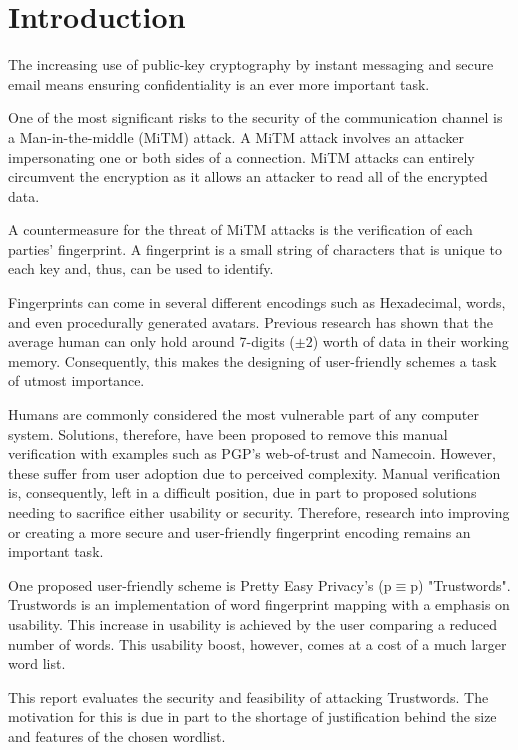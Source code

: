 \chapter{Introduction}
\label{cha:Introduction}

The increasing use of public-key cryptography by instant messaging and secure email means ensuring confidentiality is an ever more important task.

One of the most significant risks to the security of the communication channel is a Man-in-the-middle (MiTM) attack. A MiTM attack involves an attacker impersonating one or both sides of a connection. MiTM attacks can entirely circumvent the encryption as it allows an attacker to read all of the encrypted data. 

A countermeasure for the threat of MiTM attacks is the verification of each parties’ fingerprint. A fingerprint is a small string of characters that is unique to each key and, thus, can be used to identify.

Fingerprints can come in several different encodings such as Hexadecimal, words, and even procedurally generated avatars. Previous research has shown that the average human can only hold around 7-digits ($\pm 2$) worth of data in their working memory\cite{miller1956magical}. Consequently, this makes the designing of user-friendly schemes a task of utmost importance.

Humans are commonly considered the most vulnerable part of any computer system. Solutions, therefore, have been proposed to remove this manual verification with examples such as PGP's web-of-trust\cite{callas1998openpgp} and Namecoin\cite{kalodner2015empirical}. However, these suffer from user adoption due to perceived complexity. Manual verification is, consequently, left in a difficult position, due in part to proposed solutions needing to sacrifice either usability or security. Therefore, research into improving or creating a more secure and user-friendly fingerprint encoding remains an important task.

One proposed user-friendly scheme is Pretty Easy Privacy's (p$\equiv$p) "Trustwords". Trustwords is an implementation of word fingerprint mapping with a emphasis on usability. This increase in usability is achieved by the user comparing a reduced number of words. This usability boost, however, comes at a cost of a much larger word list.

This report evaluates the security and feasibility of attacking Trustwords. The motivation for this is due in part to the shortage of justification behind the size and features of the chosen wordlist.


